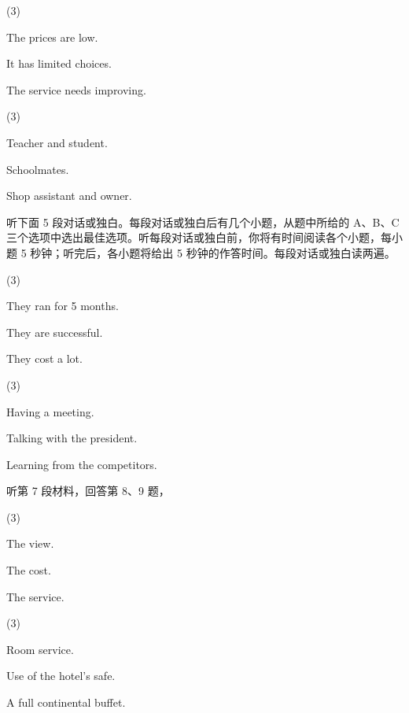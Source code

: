 \documentclass{英语试卷}
\begin{document}
\begin{choices}(3)
  \item The prices are low.
  \item It has limited choices.
  \item The service needs improving.
\end{choices}
\begin{choices}(3)
  \item Teacher and student.
  \item Schoolmates.
  \item Shop assistant and owner.
\end{choices}
\par 听下面 5 段对话或独白。每段对话或独白后有几个小题，从题中所给的 A、B、C 三个选项中选出最佳选项。听每段对话或独白前，你将有时间阅读各个小题，每小题 5 秒钟；听完后，各小题将给出 5 秒钟的作答时间。每段对话或独白读两遍。\par
{}
\begin{choices}(3)
  \item They ran for 5 months.
  \item They are successful.
  \item They cost a lot.
\end{choices}
\begin{choices}(3)
  \item Having a meeting.
  \item Talking with the president.
  \item Learning from the competitors.
\end{choices}
\par 听第 7 段材料，回答第 8、9 题，\par
{}
\begin{choices}(3)
  \item The view.
  \item The cost.
  \item The service.
\end{choices}
\begin{choices}(3)
  \item Room service.
  \item Use of the hotel's safe.
  \item A full continental buffet.
\end{choices}
\end{document}
